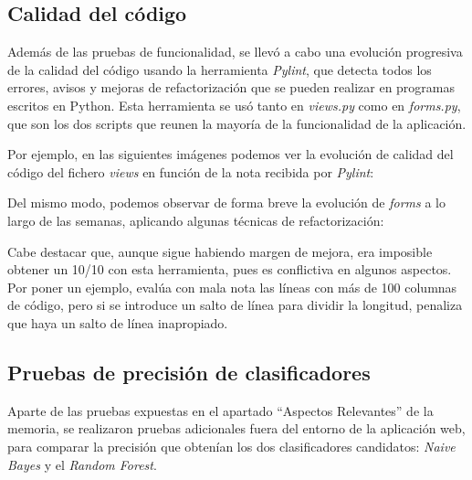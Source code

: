 \subsection{Calidad del código}
Además de las pruebas de funcionalidad, se llevó a cabo una evolución progresiva de la calidad del código usando la herramienta \emph{Pylint}, que detecta todos los errores, avisos y mejoras de refactorización que se pueden realizar en programas escritos en Python. Esta herramienta se usó tanto en \emph{views.py} como en \emph{forms.py}, que son los dos scripts que reunen la mayoría de la funcionalidad de la aplicación.

Por ejemplo, en las siguientes imágenes podemos ver la evolución de calidad del código del fichero \emph{views} en función de la nota recibida por \emph{Pylint}:





Del mismo modo, podemos observar de forma breve la evolución de \emph{forms} a lo largo de las semanas, aplicando algunas técnicas de refactorización:





Cabe destacar que, aunque sigue habiendo margen de mejora, era imposible obtener un 10/10 con esta herramienta, pues es conflictiva en algunos aspectos. Por poner un ejemplo, evalúa con mala nota las líneas con más de 100 columnas de código, pero si se introduce un salto de línea para dividir la longitud, penaliza que haya un salto de línea inapropiado.

\subsection{Pruebas de precisión de clasificadores}

Aparte de las pruebas expuestas en el apartado ``Aspectos Relevantes'' de la memoria, se realizaron pruebas adicionales fuera del entorno de la aplicación web, para comparar la precisión que obtenían los dos clasificadores candidatos: \emph{Naive Bayes} y el \emph{Random Forest}. 

